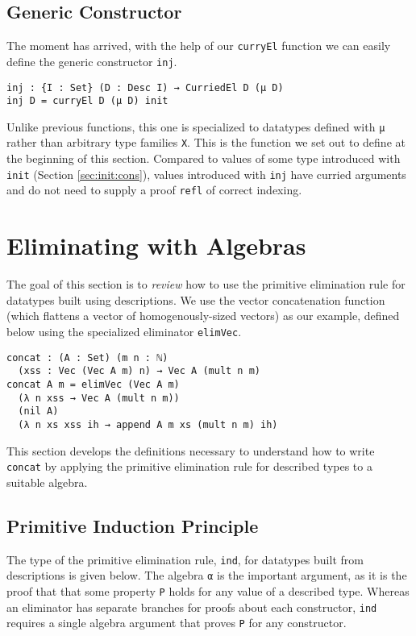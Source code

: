 \documentclass[nonatbib]{sigplanconf}
\newcommand{\refsec}[1]{Section \ref{sec:#1}}
\begin{document}
\subsection{Generic Constructor}

The moment has arrived, with the help of our {\tt curryEl} function we
can easily define the generic constructor {\tt inj}.

\begin{verbatim}
inj : {I : Set} (D : Desc I) → CurriedEl D (μ D)
inj D = curryEl D (μ D) init
\end{verbatim}

Unlike previous functions, this one is specialized to datatypes
defined with {\tt μ} rather than arbitrary type families {\tt X}. This
is the function we set out to define at the beginning of this section.
Compared to values of some type introduced with {\tt init} (\refsec{init:cons}),
values introduced with {\tt inj} have curried arguments and do not
need to supply a proof {\tt refl} of correct indexing.

\section{Eliminating with Algebras}
\label{sec:ind}

The goal of this section is to {\it review} how to use the primitive
elimination rule for datatypes built using descriptions. We use
the vector concatenation function (which flattens a vector of
homogenously-sized vectors) as our example, defined below using the
specialized eliminator {\tt elimVec}.

\begin{verbatim}
concat : (A : Set) (m n : ℕ)
  (xss : Vec (Vec A m) n) → Vec A (mult n m)
concat A m = elimVec (Vec A m)
  (λ n xss → Vec A (mult n m))
  (nil A)
  (λ n xs xss ih → append A m xs (mult n m) ih)
\end{verbatim}

This section develops the definitions necessary to understand how to
write {\tt concat} by applying the primitive elimination rule for
described types to a suitable algebra.

\subsection{Primitive Induction Principle}

The type of the primitive elimination rule, {\tt ind}, for datatypes built from
descriptions is given below.
The algebra {\tt α} is the important argument, as it is the proof that
that some property {\tt P} holds for any value of a
described type.
Whereas an eliminator
has separate branches for proofs about each constructor, {\tt ind}
requires a single algebra argument that proves {\tt P} for any
constructor.
\end{document}
